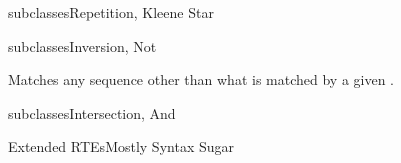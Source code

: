 \newsavebox\notbox
\begin{lrbox}{\notbox}
  \begin{minipage}{12cm}
    
  \end{minipage}
\end{lrbox}


\begin{frame}{ subclasses}{Repetition, Kleene Star}
  \usebox\starbox
\end{frame}

\begin{frame}{ subclasses}{Inversion, Not}
  \usebox\notbox

  Matches any sequence other than what is matched by a given .
\end{frame}

\begin{frame}{ subclasses}{Intersection, And}
  \usebox\andbox
 \end{frame}


\newsavebox\extendedbox
\begin{lrbox}{\extendedbox}
  \begin{minipage}{12cm}
  
  \end{minipage}
\end{lrbox}

\begin{frame}{Extended RTEs}{Mostly Syntax Sugar}
  \usebox\extendedbox
\end{frame}





